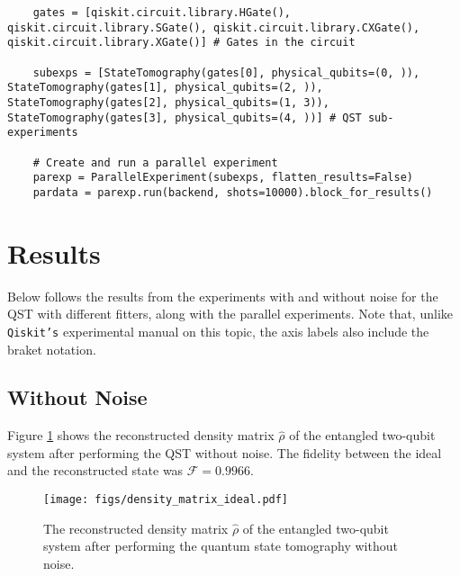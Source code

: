 \documentclass[a4paper,12pt]{article}
\begin{document}
\begin{tcolorbox}[title = {\footnotesize\textbf{Code Snippet, Parallel Experiments}}, colback=black!15!white, colframe=black]
    \begin{adjustwidth}{0.25cm}{0cm}
    
    {\footnotesize 
    \begin{verbatim}
    gates = [qiskit.circuit.library.HGate(), qiskit.circuit.library.SGate(), qiskit.circuit.library.CXGate(), qiskit.circuit.library.XGate()] # Gates in the circuit

    subexps = [StateTomography(gates[0], physical_qubits=(0, )), StateTomography(gates[1], physical_qubits=(2, )), StateTomography(gates[2], physical_qubits=(1, 3)), StateTomography(gates[3], physical_qubits=(4, ))] # QST sub-experiments

    # Create and run a parallel experiment
    parexp = ParallelExperiment(subexps, flatten_results=False)
    pardata = parexp.run(backend, shots=10000).block_for_results()
    \end{verbatim}
    }
    \end{adjustwidth}
\end{tcolorbox}
\vspace{-0.2cm}
\section{Results}
Below follows the results from the experiments with and without noise for the QST with different fitters, along with the parallel experiments. Note that, unlike \texttt{Qiskit's} experimental manual on this topic, the axis labels also include the braket notation.

\subsection{Without Noise}
Figure \ref{fig:ideal} shows the reconstructed density matrix $\hat{\rho}$ of the entangled two-qubit system after performing the QST without noise. The fidelity between the ideal and the reconstructed state was $\mathcal{F} = 0.9966$. 
\begin{figure}[H]
    \centering
    \texttt{[image: figs/density\_matrix\_ideal.pdf]}
    \caption{The reconstructed density matrix $\hat{\rho}$ of the entangled two-qubit system after performing the quantum state tomography without noise.}
    \label{fig:ideal}
\end{figure}
\vspace{-0.7cm}
\end{document}
